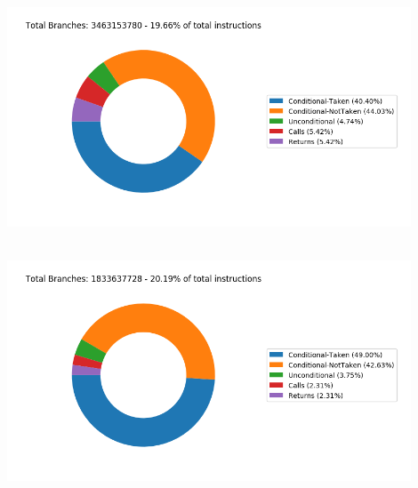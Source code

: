    \begin{minipage}{\textwidth}
      \begin{center}
         \\
         \vspace{3mm}
         \includegraphics[width=0.9\textwidth, frame]{./graphs/4-1/445-gobmk.png}
         \vspace{6mm}
      \end{center}
   \end{minipage}

   \begin{minipage}{\textwidth}
      \begin{center}
         \\
         \vspace{3mm}
         \includegraphics[width=0.9\textwidth, frame]{./graphs/4-1/450-soplex.png}
         \vspace{6mm}
      \end{center}
   \end{minipage}

